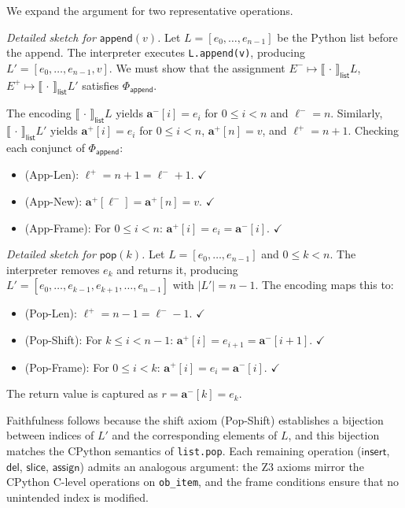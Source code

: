 \documentclass[11pt]{article}
\newcommand{\arrvar}[1]{\mathbf{a}_{#1}}
\newcommand{\lenvar}[1]{\ell_{#1}}
\newcommand{\MutApp}{\ensuremath{\mathsf{append}}}
\newcommand{\MutIns}{\ensuremath{\mathsf{insert}}}
\newcommand{\MutPop}{\ensuremath{\mathsf{pop}}}
\newcommand{\MutDel}{\ensuremath{\mathsf{del}}}
\newcommand{\MutSlice}{\ensuremath{\mathsf{slice}}}
\newcommand{\MutAssign}{\ensuremath{\mathsf{assign}}}
\newcommand{\prestate}[1]{#1^{-}}
\newcommand{\poststate}[1]{#1^{+}}
\newcommand{\seqsem}{\llbracket\,\cdot\,\rrbracket_{\mathsf{list}}}
\begin{document}
\begin{remark}\label{rem:mechanize}
We expand the argument for two representative operations.

\emph{Detailed sketch for $\MutApp(v)$.}  Let $L = [e_0, \ldots, e_{n-1}]$
be the Python list before the append.  The interpreter executes
\texttt{L.append(v)}, producing $L' = [e_0, \ldots, e_{n-1}, v]$.  We must
show that the assignment $\prestate{E} \mapsto \seqsem{L}$,
$\poststate{E} \mapsto \seqsem{L'}$ satisfies $\Phi_{\MutApp}$.

The encoding $\seqsem{L}$ yields $\prestate{\arrvar{}}[i] = e_i$ for
$0 \leq i < n$ and $\prestate{\lenvar{}} = n$.  Similarly,
$\seqsem{L'}$ yields $\poststate{\arrvar{}}[i] = e_i$ for $0 \leq i < n$,
$\poststate{\arrvar{}}[n] = v$, and $\poststate{\lenvar{}} = n + 1$.
Checking each conjunct of $\Phi_{\MutApp}$:
\begin{itemize}[nosep]
  \item (App-Len): $\poststate{\lenvar{}} = n + 1
        = \prestate{\lenvar{}} + 1$. $\checkmark$
  \item (App-New): $\poststate{\arrvar{}}[\prestate{\lenvar{}}]
        = \poststate{\arrvar{}}[n] = v$. $\checkmark$
  \item (App-Frame): For $0 \leq i < n$:
        $\poststate{\arrvar{}}[i] = e_i = \prestate{\arrvar{}}[i]$.
        $\checkmark$
\end{itemize}

\emph{Detailed sketch for $\MutPop(k)$.}
Let $L = [e_0, \ldots, e_{n-1}]$ and $0 \leq k < n$.  The interpreter
removes $e_k$ and returns it, producing
$L' = [e_0, \ldots, e_{k-1}, e_{k+1}, \ldots, e_{n-1}]$ with
$|L'| = n-1$.  The encoding maps this to:
\begin{itemize}[nosep]
  \item (Pop-Len): $\poststate{\lenvar{}} = n - 1
        = \prestate{\lenvar{}} - 1$. $\checkmark$
  \item (Pop-Shift): For $k \leq i < n-1$:
        $\poststate{\arrvar{}}[i] = e_{i+1}
        = \prestate{\arrvar{}}[i+1]$. $\checkmark$
  \item (Pop-Frame): For $0 \leq i < k$:
        $\poststate{\arrvar{}}[i] = e_i
        = \prestate{\arrvar{}}[i]$. $\checkmark$
\end{itemize}
The return value is captured as
$r = \prestate{\arrvar{}}[k] = e_k$.

Faithfulness follows because the shift axiom (Pop-Shift) establishes a
bijection between indices of $L'$ and the corresponding elements of $L$,
and this bijection matches the CPython semantics of \texttt{list.pop}.
Each remaining operation (\MutIns, \MutDel, \MutSlice, \MutAssign) admits
an analogous argument: the Z3 axioms mirror the CPython C-level operations
on \texttt{ob\_item}, and the frame conditions ensure that no unintended
index is modified.
\end{remark}
\end{document}
